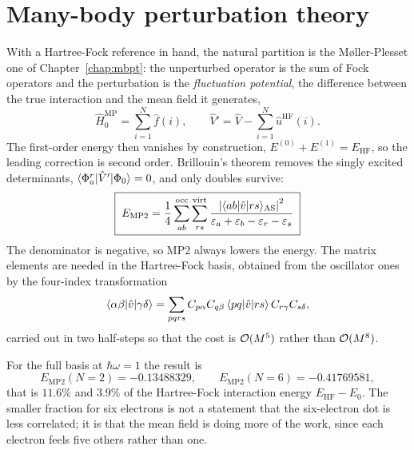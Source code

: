 \section{Many-body perturbation theory}
\label{sec:qdmbpt}

With a Hartree-Fock reference in hand, the natural partition is the
M{\o}ller-Plesset one of Chapter~\ref{chap:mbpt}: the unperturbed operator is
the sum of Fock operators and the perturbation is the \emph{fluctuation
potential}, the difference between the true interaction and the mean field it
generates,
\begin{equation}
  \hat{H}_0^{\mathrm{MP}} = \sum_{i=1}^{N}\hat{f}(i),
  \qquad
  \hat{V}' = \hat{V} - \sum_{i=1}^{N}\hat{u}^{\mathrm{HF}}(i).
  \label{eq:11-mppartition}
\end{equation}
The first-order energy then vanishes by construction,
$E^{(0)}+E^{(1)}=E_{\mathrm{HF}}$, so the leading correction is second order.
Brillouin's theorem removes the singly excited determinants,
$\langle \Phi_a^r | \hat{V}' | \Phi_0 \rangle=0$, and only doubles survive:
\begin{equation}
  \boxed{\;
  E_{\mathrm{MP2}}
   = \frac14\sum_{ab}^{\mathrm{occ}}\sum_{rs}^{\mathrm{virt}}
     \frac{\left\vert\langle ab | \hat{v} | rs \rangle_{\mathrm{AS}}\right\vert^2}
          {\varepsilon_a+\varepsilon_b-\varepsilon_r-\varepsilon_s} \;}
  \label{eq:11-mp2}
\end{equation}
The denominator is negative, so MP2 always lowers the energy.  The matrix
elements are needed in the Hartree-Fock basis, obtained from the oscillator
ones by the four-index transformation
\begin{equation}
  \langle \alpha\beta | \hat{v} | \gamma\delta \rangle
   = \sum_{pqrs}C_{p\alpha}C_{q\beta}\,
     \langle pq | \hat{v} | rs \rangle\,C_{r\gamma}C_{s\delta},
  \label{eq:11-transformation}
\end{equation}
carried out in two half-steps so that the cost is $\mathcal{O}(M^5)$ rather than
$\mathcal{O}(M^8)$.

For the full basis at $\hbar\omega=1$ the result is
\begin{equation}
  E_{\mathrm{MP2}}(N=2) = -0.13488329,
  \qquad
  E_{\mathrm{MP2}}(N=6) = -0.41769581,
  \label{eq:11-mp2results}
\end{equation}
that is $11.6\%$ and $3.9\%$ of the Hartree-Fock interaction energy
$E_{\mathrm{HF}}-E_0$.  The smaller fraction for six electrons is not a
statement that the six-electron dot is less correlated; it is that the mean
field is doing more of the work, since each electron feels five others rather
than one.

